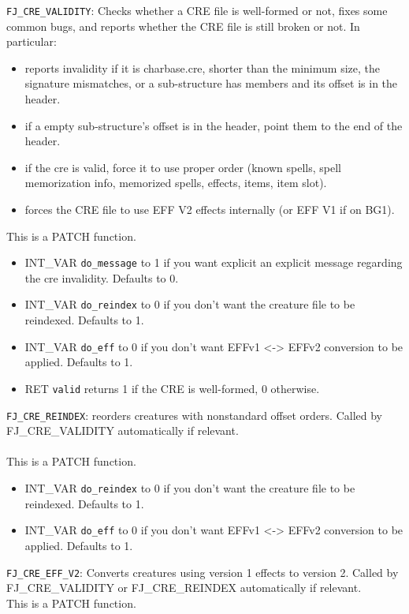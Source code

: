 \documentclass{article}
\begin{document}
\verb+FJ_CRE_VALIDITY+: Checks whether a CRE file is well-formed or not, fixes some common bugs, and reports whether the CRE file is still broken or not. In particular:
\begin{itemize}
\item reports invalidity if it is charbase.cre, shorter than the minimum size, the signature mismatches, or a sub-structure has members and its offset is in the header.
\item if a empty sub-structure's offset is in the header, point them to the end of the header.
\item if the cre is valid, force it to use proper order (known spells, spell memorization info, memorized spells, effects, items, item slot).
\item forces the CRE file to use EFF V2 effects internally (or EFF V1 if on BG1).
\end{itemize}
This is a PATCH function.
\begin{itemize}
\item INT_VAR \verb+do_message+ to 1 if you want explicit an explicit message regarding the cre invalidity. Defaults to 0.
\item INT_VAR \verb+do_reindex+ to 0 if you don't want the creature file to be reindexed. Defaults to 1.
\item INT_VAR \verb+do_eff+ to 0 if you don't want EFFv1 <-> EFFv2 conversion to be applied. Defaults to 1.
\item RET \verb+valid+ returns 1 if the CRE is well-formed, 0 otherwise.
\end{itemize}

\verb+FJ_CRE_REINDEX+: reorders creatures with nonstandard offset orders. Called by FJ_CRE_VALIDITY automatically if relevant.\\\\
This is a PATCH function.
\begin{itemize}
\item INT_VAR \verb+do_reindex+ to 0 if you don't want the creature file to be reindexed. Defaults to 1.
\item INT_VAR \verb+do_eff+ to 0 if you don't want EFFv1 <-> EFFv2 conversion to be applied. Defaults to 1.
\end{itemize}

\verb+FJ_CRE_EFF_V2+: Converts creatures using version 1 effects to version 2. Called by FJ_CRE_VALIDITY or FJ_CRE_REINDEX automatically if relevant.\\
This is a PATCH function.
\end{document}
